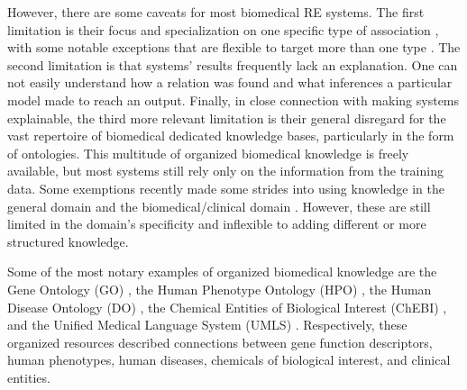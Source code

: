 However, there are some caveats for most biomedical RE systems. The first limitation is their focus and specialization on one specific type of association \citep{hu2021survey}, with some notable exceptions that are flexible to target more than one type \citep{song2019leveraging,sousa2020biont,sousa2022biomedical}. The second limitation is that systems' results frequently lack an explanation. One can not easily understand how a relation was found and what inferences a particular model made to reach an output. Finally, in close connection with making systems explainable, the third more relevant limitation is their general disregard for the vast repertoire of biomedical dedicated knowledge bases, particularly in the form of ontologies. This multitude of organized biomedical knowledge is freely available, but most systems still rely only on the information from the training data. Some exemptions recently made some strides into using knowledge in the general domain \citep{liu2020k} and the biomedical/clinical domain \citep{hao2020enhancing}. However, these are still limited in the domain's specificity and inflexible to adding different or more structured knowledge.  

Some of the most notary examples of organized biomedical knowledge are the Gene Ontology (GO) \citep{ashburner2000gene,gene2019gene}, the Human Phenotype Ontology (HPO) \citep{kohler2021human}, the Human Disease Ontology (DO) \citep{schriml2022human}, the Chemical Entities of Biological Interest (ChEBI) \citep{degtyarenko2007chebi}, and the Unified Medical Language System (UMLS) \citep{bodenreider2004unified}. Respectively, these organized resources described connections between gene function descriptors, human phenotypes, human diseases, chemicals of biological interest, and clinical entities. 

